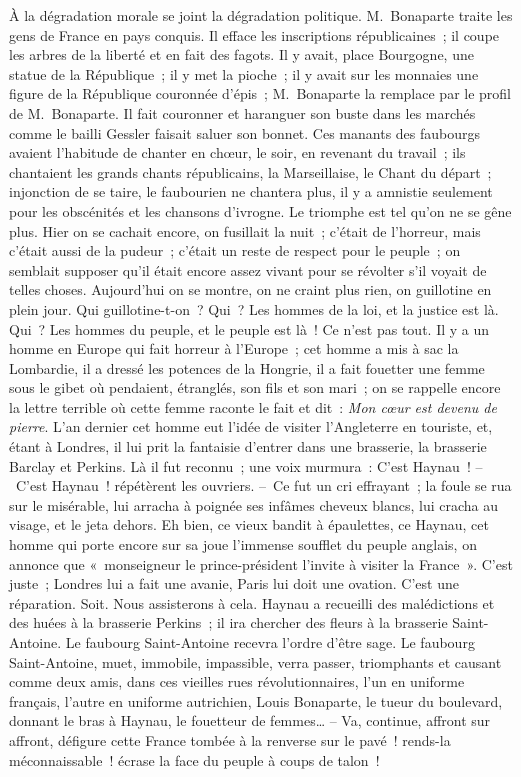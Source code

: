 \documentclass[french,twoside]{book} %
\begin{document}
À la dégradation morale se joint la dégradation politique. M. Bonaparte traite les gens de France en pays conquis. Il efface les inscriptions républicaines ; il coupe les arbres de la liberté et en fait des fagots. Il y avait, place Bourgogne, une statue de la République ; il y met la pioche ; il y avait sur les monnaies une figure de la République couronnée d’épis ; M. Bonaparte la remplace par le profil de M. Bonaparte. Il fait couronner et haranguer son buste dans les marchés comme le bailli Gessler faisait saluer son bonnet. Ces manants des faubourgs avaient l’habitude de chanter en chœur, le soir, en revenant du travail ; ils chantaient les grands chants républicains, la Marseillaise, le Chant du départ ; injonction de se taire, le faubourien ne chantera plus, il y a amnistie seulement pour les obscénités et les chansons d’ivrogne. Le triomphe est tel qu’on ne se gêne plus. Hier on se cachait encore, on fusillait la nuit ; c’était de l’horreur, mais c’était aussi de la pudeur ; c’était un reste de respect pour le peuple ; on semblait supposer qu’il était encore assez vivant pour se révolter s’il voyait de telles choses. Aujourd’hui on se montre, on ne craint plus rien, on guillotine en plein jour. Qui guillotine-t-on ? Qui ? Les hommes de la loi, et la justice est là. Qui ? Les hommes du peuple, et le peuple est là ! Ce n’est pas tout. Il y a un homme en Europe qui fait horreur à l’Europe ; cet homme a mis à sac la Lombardie, il a dressé les potences de la Hongrie, il a fait fouetter une femme sous le gibet où pendaient, étranglés, son fils et son mari ; on se rappelle encore la lettre terrible où cette femme raconte le fait et dit : \emph{Mon cœur est devenu de pierre}. L’an dernier cet homme eut l’idée de visiter l’Angleterre en touriste, et, étant à Londres, il lui prit la fantaisie d’entrer dans une brasserie, la brasserie Barclay et Perkins. Là il fut reconnu ; une voix murmura : C’est Haynau ! – C’est Haynau ! répétèrent les ouvriers. – Ce fut un cri effrayant ; la foule se rua sur le misérable, lui arracha à poignée ses infâmes cheveux blancs, lui cracha au visage, et le jeta dehors. Eh bien, ce vieux bandit à épaulettes, ce Haynau, cet homme qui porte encore sur sa joue l’immense soufflet du peuple anglais, on annonce que « monseigneur le prince-président l’invite à visiter la France ». C’est juste ; Londres lui a fait une avanie, Paris lui doit une ovation. C’est une réparation. Soit. Nous assisterons à cela. Haynau a recueilli des malédictions et des huées à la brasserie Perkins ; il ira chercher des fleurs à la brasserie Saint-Antoine. Le faubourg Saint-Antoine recevra l’ordre d’être sage. Le faubourg Saint-Antoine, muet, immobile, impassible, verra passer, triomphants et causant comme deux amis, dans ces vieilles rues révolutionnaires, l’un en uniforme français, l’autre en uniforme autrichien, Louis Bonaparte, le tueur du boulevard, donnant le bras à Haynau, le fouetteur de femmes… – Va, continue, affront sur affront, défigure cette France tombée à la renverse sur le pavé ! rends-la méconnaissable ! écrase la face du peuple à coups de talon !\par
\end{document}
